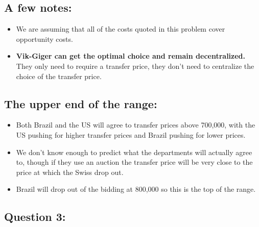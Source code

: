 \hypertarget{a-few-notes}{%
\subsection{A few notes:}\label{a-few-notes}}

\begin{itemize}
\tightlist
\item
  We are assuming that all of the costs quoted in this problem cover
  opportunity costs.
\item
  \textbf{Vik-Giger can get the optimal choice and remain
  decentralized.} They only need to require a transfer price, they don't
  need to centralize the choice of the transfer price.
\end{itemize}

\hypertarget{the-upper-end-of-the-range}{%
\subsection{The upper end of the
range:}\label{the-upper-end-of-the-range}}

\begin{itemize}
\tightlist
\item
  Both Brazil and the US will agree to transfer prices above 700,000,
  with the US pushing for higher transfer prices and Brazil pushing for
  lower prices.
\item
  We don't know enough to predict what the departments will actually
  agree to, though if they use an auction the transfer price will be
  very close to the price at which the Swiss drop out.
\item
  Brazil will drop out of the bidding at 800,000 so this is the top of
  the range.
\end{itemize}

\hypertarget{question-3}{%
\subsection{Question 3:}\label{question-3}}


